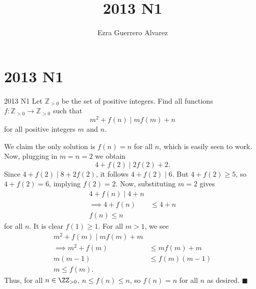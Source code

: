 \documentclass[14pt]{article}
\title{2013 N1}
\author{Ezra Guerrero Alvarez}
\begin{document}
\maketitle
	
\section*{2013 N1}

\begin{statement}{2013 N1}
	Let $\mathbb{Z} _{>0}$ be the set of positive integers. Find all functions  $f: \mathbb{Z} _{>0}\rightarrow \mathbb{Z} _{>0}$ such that
	\[ m^2 + f(n) \mid mf(m) +n \]
	for all positive integers $m$ and $n$.
\end{statement}
We claim the only solution is $f(n)=n$ for all $n$, which is easily seen to work. Now, plugging in $m=n=2$ we obtain
\[ 4+f(2)\mid 2f(2)+2. \]
Since $4+f(2)\mid 8+2f(2)$, it follows $4+f(2)\mid 6$. But $4+f(2)\ge5$, so $4+f(2)=6$, implying $f(2)=2$. Now, substituting $m=2$ gives
\begin{align*}
	4+f(n)\mid 4+n\\
	\implies 4+f(n)&\le4+n\\
	f(n)\le n
\end{align*}
for all $n$. It is clear $f(1)\ge1$. For all $m>1$, we see
\begin{align*}
	m^2+f(m)\mid mf(m)+m\\
	\implies m^2+f(m)&\le mf(m)+m\\
	m(m-1)&\le f(m)(m-1)\\
	m\le f(m).
\end{align*}
Thus, for all $n\in\ZZ_{>0}$, $n\le f(n)\le n$, so $f(n)=n$ for all $n$ as desired. $\blacksquare$
	
\end{document}
